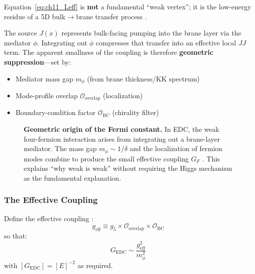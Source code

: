 \begin{tcolorbox}[edcCornerstone, title=\textbf{Physical Interpretation (Canonical)}]
Equation~\eqref{eq:ch11_Leff} is \textbf{not} a fundamental ``weak vertex'';
it is the low-energy residue of a 5D bulk$\to$brane transfer process \tagDc{}.

The source $J(x)$ represents bulk-facing pumping into the brane layer via the
mediator $\phi$. Integrating out $\phi$ compresses that transfer into an
effective local $JJ$ term. The apparent smallness of the coupling is therefore
\textbf{geometric suppression}---set by:
\begin{itemize}[nosep]
    \item Mediator mass gap $m_\phi$ (from brane thickness/KK spectrum)
    \item Mode-profile overlap $\mathcal{O}_{\text{overlap}}$ (localization)
    \item Boundary-condition factor $\mathcal{O}_{\text{BC}}$ (chirality filter)
\end{itemize}
\end{tcolorbox}

\begin{figure}[htbp]
\centering

\caption{\textbf{Geometric origin of the Fermi constant.}
In EDC, the weak four-fermion interaction arises from integrating out a
brane-layer mediator. The mass gap $m_\phi \sim 1/\delta$ and the localization
of fermion modes combine to produce the small effective coupling $G_F$ \tagDc{}.
This explains ``why weak is weak'' without requiring the Higgs mechanism as
the fundamental explanation.}
\label{fig:ch11_mediator_integration}
\end{figure}

\subsubsection{The Effective Coupling}

Define the effective coupling \tagP{}:
\begin{equation}
    g_{\text{eff}} \equiv g_5 \times \mathcal{O}_{\text{overlap}}
    \times \mathcal{O}_{\text{BC}}
    \label{eq:ch11_geff}
\end{equation}
so that:
\begin{equation}
    \boxed{
    G_{\text{EDC}} \sim \frac{g_{\text{eff}}^2}{m_\phi^2}
    }
    \label{eq:ch11_GEDC}
\end{equation}
with $[G_{\text{EDC}}] = [E]^{-2}$ as required.

